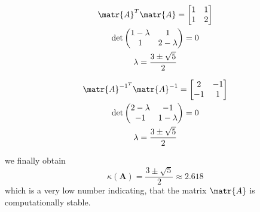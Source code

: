 \parbox{0.5\textwidth}{
\begin{gather*}
    \matr{A}^T\matr{A} = 
    \begin{bmatrix}
        1 & 1 \\
        1 & 2
    \end{bmatrix} \\
    \det\begin{pmatrix}
        1-\lambda & 1 \\
        1 & 2-\lambda
    \end{pmatrix} = 0 \\
    \lambda=\frac{3\pm\sqrt{5}}{2}
    \end{gather*}
}
\parbox{0.5\textwidth}{
\begin{gather*}
     \matr{A}^{-1^T}\matr{A}^{-1} = 
    \begin{bmatrix}
        2 & -1 \\
        -1 & 1
    \end{bmatrix} \\
    \det\begin{pmatrix}
        2-\lambda & -1 \\
        -1 & 1-\lambda
    \end{pmatrix} = 0 \\
    \lambda=\frac{3\pm\sqrt{5}}{2}
\end{gather*}
}
we finally obtain
\begin{equation*}
    \kappa(\mathbf{A})=\frac{3\pm\sqrt{5}}{2}\approx2.618
\end{equation*}
which is a very low number indicating, that the matrix $\matr{A}$ is computationally stable.